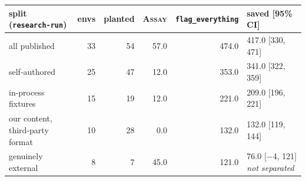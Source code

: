 \begin{tabular}{@{}lrrrrl@{}}
\toprule
split (\texttt{research-run}) & envs & planted & \textsc{Assay} & \texttt{flag\_everything} & saved [95\% CI] \\
\midrule
all published & 33 & 54 & 57.0 & 474.0 & 417.0 [330, 471] \\
self-authored & 25 & 47 & 12.0 & 353.0 & 341.0 [322, 359] \\
in-process fixtures & 15 & 19 & 12.0 & 221.0 & 209.0 [196, 221] \\
our content, third-party format & 10 & 28 & 0.0 & 132.0 & 132.0 [119, 144] \\
genuinely external & 8 & 7 & 45.0 & 121.0 & 76.0 [$-$4, 121] \emph{not separated} \\
\bottomrule
\end{tabular}
